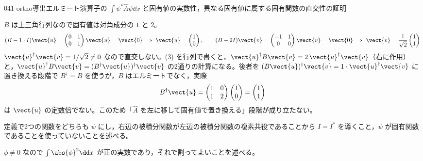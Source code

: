 \documentclass[uplatex,dvipdfmx,a4paper,11pt]{jsarticle}
\begin{document}
\begin{mondai}{041-ortho}{導出}{エルミート演算子の $\int\psi^{*}\hat{A}\psi\dd x$ と固有値の実数性，異なる固有値に属する固有関数の直交性の証明}
\begin{tadashii}
 $B$ は上三角行列なので固有値は対角成分の $1$ と $2$。
\[
  (B-1\cdot I)\vect{u}=\begin{pmatrix}0&1\\0&1\end{pmatrix}\vect{u}=\vect{0}\ \Rightarrow\ \vect{u}=\begin{pmatrix}1\\0\end{pmatrix},\qquad
  (B-2I)\vect{v}=\begin{pmatrix}-1&1\\0&0\end{pmatrix}\vect{v}=\vect{0}\ \Rightarrow\ \vect{v}=\frac{1}{\sqrt{2}}\begin{pmatrix}1\\1\end{pmatrix}
\]
$\vect{u}^{\dagger}\vect{v}=1/\sqrt{2}\neq0$ なので直交しない。(3) を行列で書くと，$\vect{u}^{\dagger}B\vect{v}=2\,\vect{u}^{\dagger}\vect{v}$（右に作用）と，$\vect{u}^{\dagger}B\vect{v}=(B^{\dagger}\vect{u})^{\dagger}\vect{v}$ の2通りの計算になる。後者を $(B\vect{u})^{\dagger}\vect{v}=1\cdot\vect{u}^{\dagger}\vect{v}$ に置き換える段階で $B^{\dagger}=B$ を使うが，$B$ はエルミートでなく，実際
\[
  B^{\dagger}\vect{u}=\begin{pmatrix}1&0\\1&2\end{pmatrix}\begin{pmatrix}1\\0\end{pmatrix}=\begin{pmatrix}1\\1\end{pmatrix}
\]
は $\vect{u}$ の定数倍でない。このため「$\hat{A}$ を左に移して固有値で置き換える」段階が成り立たない。
\begin{ronten}
  \item {} 定義で2つの関数をどちらも $\psi$ にし，右辺の被積分関数が左辺の被積分関数の複素共役であることから $I=I^{*}$ を導くこと，$\psi$ が固有関数であることを使っていないことを述べる。
  \item {} $\phi\neq0$ なので $\int\abs{\phi}^{2}\dd x$ が正の実数であり，それで割ってよいことを述べる。

\end{ronten}
\end{tadashii}
\end{mondai}
\end{document}

